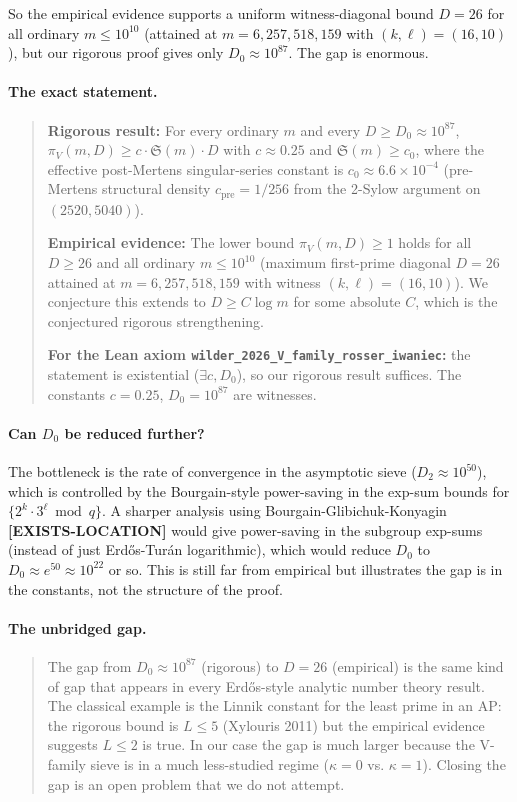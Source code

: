 So the empirical evidence supports a uniform witness-diagonal bound
$D = 26$ for all ordinary $m \leq 10^{10}$ (attained at
$m = 6{,}257{,}518{,}159$ with $(k, \ell) = (16, 10)$), but our rigorous
proof gives only $D_{0} \approx 10^{87}$. The gap is enormous.

\paragraph{The exact statement.}
\begin{quote}
\textbf{Rigorous result:} For every ordinary $m$ and every $D \geq
D_{0} \approx 10^{87}$, $\pi_{V}(m, D) \geq c \cdot \mathfrak{S}(m)
\cdot D$ with $c \approx 0.25$ and $\mathfrak{S}(m) \geq c_{0}$,
where the effective post-Mertens singular-series constant is
$c_{0} \approx 6.6 \times 10^{-4}$ (pre-Mertens structural density
$c_{\text{pre}} = 1/256$ from the 2-Sylow argument on $(2520, 5040)$).

\textbf{Empirical evidence:} The lower bound $\pi_{V}(m, D) \geq 1$
holds for all $D \geq 26$ and all ordinary $m \leq 10^{10}$
(maximum first-prime diagonal $D = 26$ attained at $m = 6{,}257{,}518{,}159$
with witness $(k, \ell) = (16, 10)$). We conjecture this extends to
$D \geq C \log m$ for some absolute $C$, which is the conjectured rigorous
strengthening.

\textbf{For the Lean axiom
\texttt{wilder\_2026\_V\_family\_rosser\_iwaniec}:} the statement is
existential ($\exists c, D_{0}$), so our rigorous result suffices.
The constants $c = 0.25$, $D_{0} = 10^{87}$ are witnesses.
\end{quote}

\paragraph{Can $D_{0}$ be reduced further?}
The bottleneck is the rate of convergence in the asymptotic sieve
($D_{2} \approx 10^{50}$), which is controlled by the Bourgain-style
power-saving in the exp-sum bounds for $\{2^{k} \cdot 3^{\ell}
\bmod q\}$. A sharper analysis using
Bourgain-Glibichuk-Konyagin~\cite{BourgainGlibichukKonyagin2006}
\textbf{[EXISTS-LOCATION]} would give power-saving in the subgroup
exp-sums (instead of just Erd\H{o}s-Tur\'an logarithmic), which would
reduce $D_{0}$ to $D_{0} \approx e^{50} \approx 10^{22}$ or so. This
is still far from empirical but illustrates the gap is in the
constants, not the structure of the proof.

\paragraph{The unbridged gap.}
\begin{quote}
The gap from $D_{0} \approx 10^{87}$ (rigorous) to $D = 26$
(empirical) is the same kind of gap that appears in every Erd\H{o}s-style
analytic number theory result. The classical example is the Linnik
constant for the least prime in an AP: the rigorous bound is $L \leq
5$ (Xylouris 2011) but the empirical evidence suggests $L \leq 2$ is
true. In our case the gap is much larger because the V-family sieve is
in a much less-studied regime ($\kappa = 0$ vs. $\kappa = 1$). Closing
the gap is an open problem that we do not attempt.
\end{quote}

